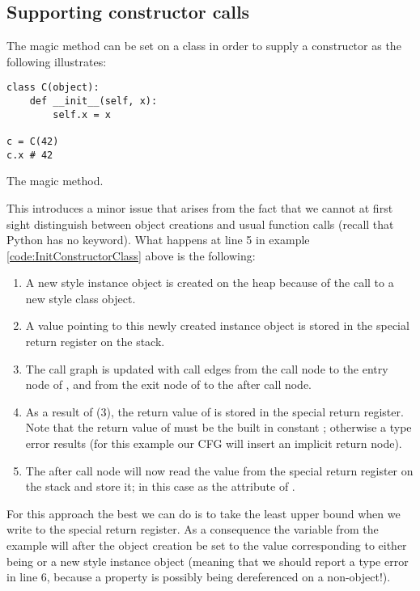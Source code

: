 \subsection{Supporting constructor calls}
The magic method  can be set on a class in order to supply a constructor as the following illustrates:

\begin{listing}[H]
	\begin{verbatim}
class C(object):
	def __init__(self, x):
		self.x = x

c = C(42)
c.x # 42
	\end{verbatim}
	\caption{The  magic method.}\label{code:InitConstructorClass}
\end{listing}

This introduces a minor issue that arises from the fact that we cannot at first sight distinguish between object creations and usual function calls (recall that Python has no  keyword). What happens at line 5 in example \ref{code:InitConstructorClass} above is the following:

\begin{enumerate}
	\item A new style instance object is created on the heap because of the call to a new style class object.
	\item A value pointing to this newly created instance object is stored in the special return register on the stack.
	\item The call graph is updated with call edges from the call node to the entry node of , and from the exit node of  to the after call node.
	\item As a result of (3), the return value of  is stored in the special return register. Note that the return value of  must be the built in constant ; otherwise a type error results (for this example our CFG will insert an implicit return  node).
	\item The after call node will now read the value from the special return register on the stack and store it; in this case as the attribute  of .
\end{enumerate}

For this approach the best we can do is to take the least upper bound when we write to the special return register. As a consequence the variable  from the example will after the object creation be set to the value corresponding to either being  or a new style instance object (meaning that we should report a type error in line 6, because a property is possibly being dereferenced on a non-object!).

